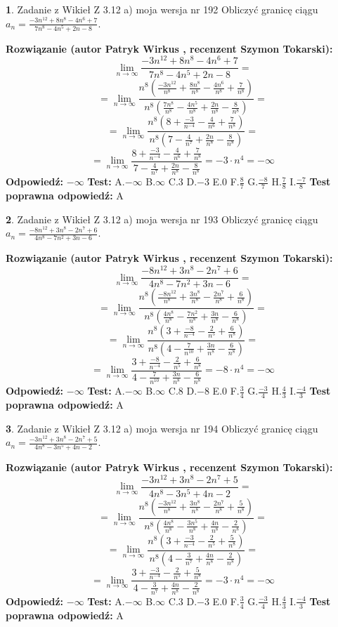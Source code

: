 \documentclass[12pt, a4paper]{article}
\theoremstyle{definition} %
\newtheorem{zad}{}
\newcommand{\zadStart}[1]{\begin{zad}#1\newline}
\newcommand{\zadStop}{\end{zad}}
\newcommand{\rozwStart}[2]{\noindent \textbf{Rozwiązanie (autor #1 , recenzent #2): }\newline}
\newcommand{\rozwStop}{\newline}
\newcommand{\odpStart}{\noindent \textbf{Odpowiedź:}\newline}
\newcommand{\odpStop}{\newline}
\newcommand{\testStart}{\noindent \textbf{Test:}\newline}
\newcommand{\testStop}{\newline}
\newcommand{\kluczStart}{\noindent \textbf{Test poprawna odpowiedź:}\newline}
\newcommand{\kluczStop}{\newline}
\begin{document}
\zadStart{Zadanie z Wikieł Z 3.12 a) moja wersja nr 192}
Obliczyć granicę ciągu $a_{n}=\frac{-3n^{12}+8n^{8}-4n^{6}+7}{7n^{8}-4n^{5}+2n-8}$.
\zadStop
\rozwStart{Patryk Wirkus}{Szymon Tokarski}
$$\lim\limits_{n\to\infty}\frac{-3n^{12}+8n^{8}-4n^{6}+7}{7n^{8}-4n^{5}+2n-8}=$$
$$=\lim\limits_{n\to\infty}\frac{n^{8}\left(\frac{-3n^{12}}{n^{8}}+\frac{8n^{8}}{n^{8}}-\frac{4n^{6}}{n^{8}}+\frac{7}{n^{8}}\right)}{n^{8}\left(\frac{7n^{8}}{n^{8}}-\frac{4n^{5}}{n^{8}}+\frac{2n}{n^{8}}-\frac{8}{n^{8}}\right)}=$$
$$=\lim\limits_{n\to\infty}\frac{n^{8}\left(8+\frac{-3}{n^{-4}}-\frac{4}{n^{6}}+\frac{7}{n^{8}}\right)}
{n^{8}\left(7-\frac{4}{n^{7}}+\frac{2n}{n^{8}}-\frac{8}{n^{8}}\right)}=$$
$$=\lim\limits_{n\to\infty}\frac{8+\frac{-3}{n^{-4}}-\frac{4}{n^{6}}+\frac{7}{n^{8}}}{7-\frac{4}{n^{7}}+\frac{2n}{n^{8}}-\frac{8}{n^{8}}}=-3\cdot n^{4} = -\infty$$
\rozwStop
\odpStart
$-\infty$
\odpStop
\testStart
A.$-\infty$
B.$\infty$
C.$3$
D.$-3$
E.$0$
F.$\frac{8}{7}$
G.$\frac{-8}{7}$
H.$\frac{7}{8}$
I.$\frac{-7}{8}$
\testStop
\kluczStart
A
\kluczStop



\zadStart{Zadanie z Wikieł Z 3.12 a) moja wersja nr 193}
Obliczyć granicę ciągu $a_{n}=\frac{-8n^{12}+3n^{8}-2n^{7}+6}{4n^{8}-7n^{2}+3n-6}$.
\zadStop
\rozwStart{Patryk Wirkus}{Szymon Tokarski}
$$\lim\limits_{n\to\infty}\frac{-8n^{12}+3n^{8}-2n^{7}+6}{4n^{8}-7n^{2}+3n-6}=$$
$$=\lim\limits_{n\to\infty}\frac{n^{8}\left(\frac{-8n^{12}}{n^{8}}+\frac{3n^{8}}{n^{8}}-\frac{2n^{7}}{n^{8}}+\frac{6}{n^{8}}\right)}{n^{8}\left(\frac{4n^{8}}{n^{8}}-\frac{7n^{2}}{n^{8}}+\frac{3n}{n^{8}}-\frac{6}{n^{8}}\right)}=$$
$$=\lim\limits_{n\to\infty}\frac{n^{8}\left(3+\frac{-8}{n^{-4}}-\frac{2}{n^{5}}+\frac{6}{n^{8}}\right)}
{n^{8}\left(4-\frac{7}{n^{10}}+\frac{3n}{n^{8}}-\frac{6}{n^{8}}\right)}=$$
$$=\lim\limits_{n\to\infty}\frac{3+\frac{-8}{n^{-4}}-\frac{2}{n^{5}}+\frac{6}{n^{8}}}{4-\frac{7}{n^{10}}+\frac{3n}{n^{8}}-\frac{6}{n^{8}}}=-8\cdot n^{4} = -\infty$$
\rozwStop
\odpStart
$-\infty$
\odpStop
\testStart
A.$-\infty$
B.$\infty$
C.$8$
D.$-8$
E.$0$
F.$\frac{3}{4}$
G.$\frac{-3}{4}$
H.$\frac{4}{3}$
I.$\frac{-4}{3}$
\testStop
\kluczStart
A
\kluczStop



\zadStart{Zadanie z Wikieł Z 3.12 a) moja wersja nr 194}
Obliczyć granicę ciągu $a_{n}=\frac{-3n^{12}+3n^{8}-2n^{7}+5}{4n^{8}-3n^{5}+4n-2}$.
\zadStop
\rozwStart{Patryk Wirkus}{Szymon Tokarski}
$$\lim\limits_{n\to\infty}\frac{-3n^{12}+3n^{8}-2n^{7}+5}{4n^{8}-3n^{5}+4n-2}=$$
$$=\lim\limits_{n\to\infty}\frac{n^{8}\left(\frac{-3n^{12}}{n^{8}}+\frac{3n^{8}}{n^{8}}-\frac{2n^{7}}{n^{8}}+\frac{5}{n^{8}}\right)}{n^{8}\left(\frac{4n^{8}}{n^{8}}-\frac{3n^{5}}{n^{8}}+\frac{4n}{n^{8}}-\frac{2}{n^{8}}\right)}=$$
$$=\lim\limits_{n\to\infty}\frac{n^{8}\left(3+\frac{-3}{n^{-4}}-\frac{2}{n^{5}}+\frac{5}{n^{8}}\right)}
{n^{8}\left(4-\frac{3}{n^{7}}+\frac{4n}{n^{8}}-\frac{2}{n^{8}}\right)}=$$
$$=\lim\limits_{n\to\infty}\frac{3+\frac{-3}{n^{-4}}-\frac{2}{n^{5}}+\frac{5}{n^{8}}}{4-\frac{3}{n^{7}}+\frac{4n}{n^{8}}-\frac{2}{n^{8}}}=-3\cdot n^{4} = -\infty$$
\rozwStop
\odpStart
$-\infty$
\odpStop
\testStart
A.$-\infty$
B.$\infty$
C.$3$
D.$-3$
E.$0$
F.$\frac{3}{4}$
G.$\frac{-3}{4}$
H.$\frac{4}{3}$
I.$\frac{-4}{3}$
\testStop
\kluczStart
A
\kluczStop
\end{document}
